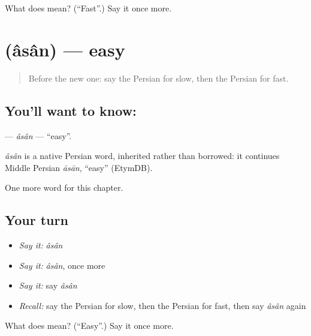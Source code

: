 \begin{tcolorbox}[breakable,colback=teal!4,colframe=teal!35!black,title={Before you move on}]
What does  mean? (\textquotedblleft{}Fast\textquotedblright{}.) Say it once more.
\end{tcolorbox}
\section[\texorpdfstring{\fa{آسان} (âsân)}{آسان (âsân)}]{ (âsân) — easy}

\label{lesson:FA-C60-asan}



\begin{quote}
Before the new one: say the Persian for slow, then the Persian for fast.
\end{quote}

\subsection*{You'll want to know: }
\textbf{} — \emph{âsân} — \textquotedblleft{}easy\textquotedblright{}.

\begin{cousinweb}
\emph{âsân} is a native Persian word, inherited rather than borrowed: it continues Middle Persian \emph{āsān}, \textquotedblleft{}easy\textquotedblright{} (EtymDB).
\end{cousinweb}

\begin{grammarlens}[title={What you've built}]
One more word for this chapter.
\end{grammarlens}

\subsection*{Your turn}
\begin{itemize}
\raggedright
  \item \emph{Say it:} \emph{âsân}
  \item \emph{Say it:} \emph{âsân}, once more
  \item \emph{Say it:} say \emph{âsân}
  \item \emph{Recall:} say the Persian for slow, then the Persian for fast, then say \emph{âsân} again
\end{itemize}

\begin{tcolorbox}[breakable,colback=teal!4,colframe=teal!35!black,title={Before you move on}]
What does  mean? (\textquotedblleft{}Easy\textquotedblright{}.) Say it once more.
\end{tcolorbox}
